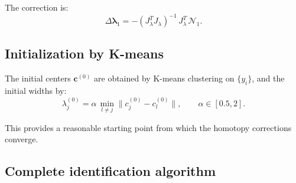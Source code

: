 \documentclass[11pt,a4paper]{article}
\begin{document}
The correction is:
\begin{equation}
\Delta\boldsymbol{\lambda}_1 = -(J_\lambda^T J_\lambda)^{-1}\,J_\lambda^T\,\mathcal{N}_1.
\label{eq:z1-lambda}
\end{equation}

\subsection{Initialization by K-means}

The initial centers $\mathbf{c}^{(0)}$ are obtained by K-means clustering on $\{y_i\}$, and the initial widths by:
\begin{equation}
\lambda_j^{(0)} = \alpha\,\min_{l \neq j}\|c_j^{(0)} - c_l^{(0)}\|, \qquad \alpha \in [0.5, 2].
\label{eq:init-lambda}
\end{equation}

This provides a reasonable starting point from which the homotopy corrections converge.

\subsection{Complete identification algorithm}
\end{document}

